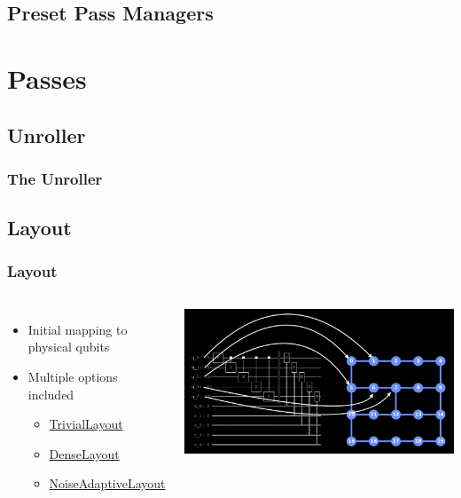 \documentclass[aspectratio=169,11pt,hyperref={colorlinks=true}]{beamer}
\begin{document}
\subsection{Preset Pass Managers}


\section{Passes}
\subsection{Unroller}
\begin{frame}
    \frametitle{The Unroller}
\end{frame}

\subsection{Layout}
\begin{frame}
    \frametitle{Layout}
    \begin{columns}
            \begin{itemize}
                \item Initial mapping to physical qubits
                \item Multiple options included
                    \begin{itemize}
                        \item \href{https://github.com/Qiskit/qiskit-terra/blob/master/qiskit/transpiler/passes/layout/trivial\_layout.py}{TrivialLayout}
                        \item \href{https://github.com/Qiskit/qiskit-terra/blob/master/qiskit/transpiler/passes/layout/dense\_layout.py}{DenseLayout}
                        \item \href{https://github.com/Qiskit/qiskit-terra/blob/master/qiskit/transpiler/passes/layout/noise\_adaptive\_layout.py}{NoiseAdaptiveLayout}
                    \end{itemize}
            \end{itemize}
            \centering
            \includegraphics[width=1.1\textwidth]{layout.png}
    \end{columns}
\end{frame}
\end{document}
